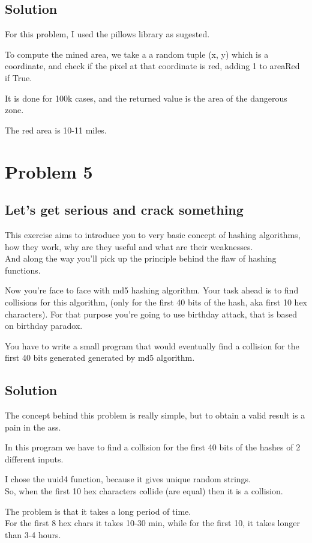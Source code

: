 \documentclass{article}
\begin{document}
    \subsection{Solution}

    \hspace{5mm}For this problem, I used the pillows library as sugested.

    To compute the mined area, we take a a random tuple (x, y) which is a
    coordinate, and check if the pixel at that coordinate is red, adding 1 to
    areaRed if True.

    It is done for 100k cases, and the returned value is the area of the
    dangerous zone.

    The red area is 10-11 miles.

  \newpage

  \section{Problem 5}

    \subsection{Let’s get serious and crack something}

    \hspace{5mm}This exercise aims to introduce you to very basic concept of
    hashing algorithms, how they work, why are they useful and what are their
    weaknesses.\\ And along the way you’ll pick up the principle behind the
    flaw of hashing functions.

    Now you’re face to face with md5 hashing algorithm. Your task ahead is
    to find collisions for this algorithm, (only for the first 40 bits of the hash, aka
    first 10 hex characters). For that purpose you’re going to use birthday attack,
    that is based on birthday paradox.

    You have to write a small program that would eventually find a collision for
    the first 40 bits generated generated by md5 algorithm.

    \subsection{Solution}

    \hspace{5mm}The concept behind this problem is really simple, but to
    obtain a valid result is a pain in the ass.

    In this program we have to find a collision for the first 40 bits of the
    hashes of 2 different inputs.

    I chose the uuid4 function, because it gives unique random strings.\\
    So, when the first 10 hex characters collide (are equal) then it is a
    collision.

    The problem is that it takes a long period of time.\\
    For the first 8 hex chars it takes 10-30 min, while for the first 10,
    it takes longer than 3-4 hours.
\end{document}
